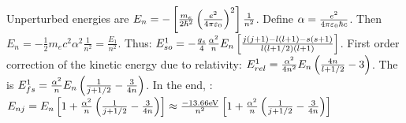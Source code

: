 Unperturbed energies are $E_n = - \left[ \frac{m_e}{2 \hbar^2} \left( \frac{e^2}{4 \pi \varepsilon_0} \right)^2 \right] \frac{1}{n^2}$.
Define $\alpha = \frac{e^2}{4 \pi \varepsilon_0 \hbar c}$. Then $E_n = - \frac{1}{2} m_e c^2 \alpha^2 \frac{1}{n^2}
= \frac{E_1}{n^2}$. Thus: $E_{so}^1 = - \frac{g_s}{4} \frac{\alpha^2}{n} E_n \left[ \frac{j(j+1) - l(l+1) - s(s+1)}{l(l+1/2)(l+1)} \right]$.
First order correction of the kinetic energy due to relativity:
$E_{rel}^1 = \frac{\alpha^2}{4 n^2} E_n \left( \frac{4 n}{l+1/2} - 3 \right)$.
The  is $E_{fs}^1 = \frac{\alpha^2}{n} E_n
\left( \frac{1}{j+1/2} - \frac{3}{4n} \right)$. In the end, : $E_{nj} = E_n \left[ 1+\frac{\alpha^2}{n} \left( \frac{1}{j+1/2} - \frac{3}{4n} \right) \right]
\approx \frac{-13.66 \mathrm{eV}}{n^2} \left[ 1+\frac{\alpha^2}{n} \left( \frac{1}{j+1/2} - \frac{3}{4n} \right) \right]$





